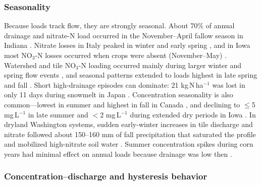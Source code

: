 \subsubsection{Seasonality}

Because loads track flow, they are strongly seasonal. About 70\% of annual drainage and nitrate-N load occurred in the November--April fallow season in Indiana \parencite{Kladivko2021,Kladivko2004}. Nitrate losses in Italy peaked in winter and early spring \parencite{ROSSI1991}, and in Iowa most NO$_3$-N losses occurred when crops were absent (November--May) \parencite{Cambardella1999}. Watershed and tile NO$_3$-N loading occurred mainly during larger winter and spring flow events \parencite{Williams2015}, and seasonal patterns extended to loads highest in late spring and fall \parencite{Chaplot2004}. Short high-drainage episodes can dominate: 21 kg\,N\,ha$^{-1}$ was lost in only 11 days during snowmelt in Japan \parencite{Hayashi1999}. Concentration seasonality is also common---lowest in summer and highest in fall in Canada \parencite{Smith2011}, and declining to $\leq$5 mg\,L$^{-1}$ in late summer and $<$2 mg\,L$^{-1}$ during extended dry periods in Iowa \parencite{Schilling2013}. In dryland Washington systems, sudden early-winter increases in tile discharge and nitrate followed about 150--160 mm of fall precipitation that saturated the profile and mobilized high-nitrate soil water \parencite{Kelley2017,Keller2008}. Summer concentration spikes during corn years had minimal effect on annual loads because drainage was low then \parencite{Kladivko2021}.

\subsubsection{Concentration--discharge and hysteresis behavior}

